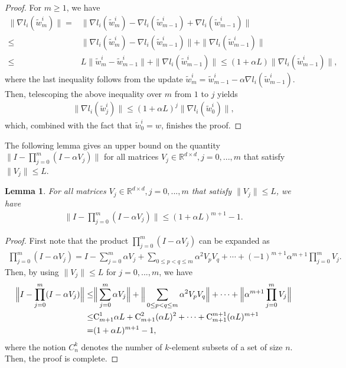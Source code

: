 \documentclass{osudissert96}
\newtheorem{lemma}{Lemma}
\begin{document}
\begin{proof}
	For $m\geq1$, we have 
	\begin{align*}
	\|\nabla l_i(\widetilde w_m^i)\| = & \|\nabla l_i(\widetilde w_m^i) - \nabla l_i(\widetilde w_{m-1}^i) + \nabla l_i(\widetilde w_{m-1}^i)\|
	\\\leq & \|\nabla l_i(\widetilde w_m^i) - \nabla l_i(\widetilde w_{m-1}^i) \| +  \|\nabla l_i(\widetilde w_{m-1}^i)\|
	\\\leq & L\|\widetilde w_m^i - \widetilde w_{m-1}^i\| +\|\nabla l_i(\widetilde w_{m-1}^i)\|\leq (1+\alpha L)\|\nabla l_i(\widetilde w_{m-1}^i)\|,
	\end{align*}
	where the last inequality follows from the update $\widetilde w_m^i =  \widetilde w_{m-1}^i - \alpha \nabla l_i(\widetilde w_{m-1}^i)$. Then, telescoping the above inequality over $m$ from $1$ to $j$ yields
	\begin{align*}
	\|\nabla l_i(\widetilde w_j^i)\| \leq (1+\alpha L)^j \|\nabla l_i(\widetilde w_0^i)\|,
	\end{align*}
	which, combined with the fact that $\widetilde w_0^i = w$, finishes the proof.  
\end{proof}
The following lemma gives an upper bound on  the quantity $\big\|I - \prod_{j=0}^m(I - \alpha V_j)\big\|$ for all matrices  $V_j \in \mathbb{R}^{d\times d},j=0,...,m$ that satisfy $\|V_j\|\leq L$.
\begin{lemma}\label{le:prd}
	For all matrices $V_j \in \mathbb{R}^{d\times d}, j =0,..., m$ that satisfy $\|V_j\|\leq L$, we have 
	\begin{align*}
	\Big\|I - \prod_{j=0}^m(I - \alpha V_j)\Big\| \leq (1+\alpha L)^{m+1} - 1.
	\end{align*}
\end{lemma}
\begin{proof}
	First note that the product $ \prod_{j=0}^m(I - \alpha V_j) $ can be expanded as  
	\begin{align}
	\prod_{j=0}^m(I - \alpha V_j) = I - \sum_{j=0}^m \alpha V_j + \sum_{0\leq p < q \leq m} \alpha^2 V_p V_q+\cdots+(-1)^{m+1} \alpha^{m+1}\prod_{j=0}^m V_j.\nonumber
	\end{align}
	Then, by using $\|V_j\|\leq L$ for $j=0,...,m$, we have 
	\begin{align}
	\Big\|I - \prod_{j=0}^m(I - \alpha V_j)\Big\|  \leq & \Big\|\sum_{j=0}^m \alpha V_j \Big\| + \Big\|\sum_{0\leq p < q \leq m} \alpha^2 V_pV_q \Big\| + \cdots + \Big\| \alpha^{m+1}\prod_{j=0}^m V_j\Big\| \nonumber
	\\\leq & {\rm C}^1_{m+1} \alpha L + {\rm C}_{m+1}^2 (\alpha L)^2 + \cdots + {\rm C}_{m+1}^{m+1} (\alpha L)^{m+1}\nonumber
	\\ = & (1+\alpha L)^{m+1} - 1, \nonumber
	\end{align}
	where the notion $C_n^k$ denotes the number of $k$-element subsets of a set of size $n$. Then, the proof is complete. 
\end{proof}
\end{document}
